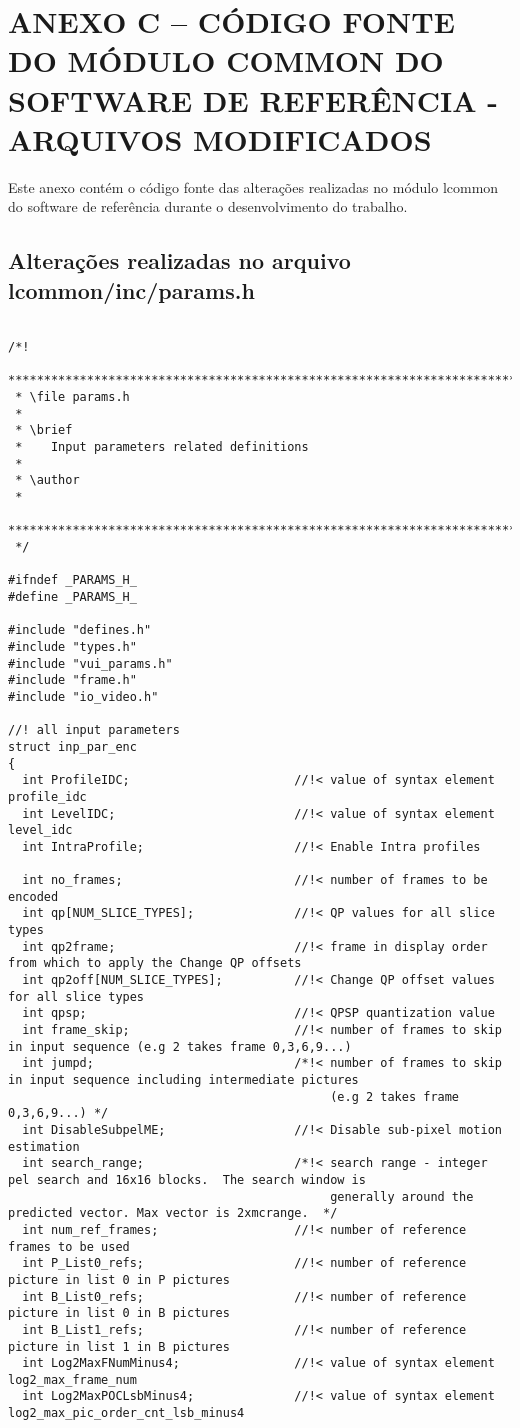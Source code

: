 \chapter{ANEXO C -- CÓDIGO FONTE DO MÓDULO COMMON DO SOFTWARE DE REFERÊNCIA - ARQUIVOS MODIFICADOS}

Este anexo contém o código fonte das alterações realizadas no módulo lcommon do software de referência durante o desenvolvimento do trabalho. 

\section{Alterações realizadas no arquivo lcommon/inc/params.h}

\begin{lstlisting}

/*!
 ************************************************************************
 * \file params.h
 *
 * \brief
 *    Input parameters related definitions
 *
 * \author
 *
 ************************************************************************
 */

#ifndef _PARAMS_H_
#define _PARAMS_H_

#include "defines.h"
#include "types.h"
#include "vui_params.h"
#include "frame.h"
#include "io_video.h"

//! all input parameters
struct inp_par_enc
{
  int ProfileIDC;                       //!< value of syntax element profile_idc
  int LevelIDC;                         //!< value of syntax element level_idc
  int IntraProfile;                     //!< Enable Intra profiles
  
  int no_frames;                        //!< number of frames to be encoded
  int qp[NUM_SLICE_TYPES];              //!< QP values for all slice types
  int qp2frame;                         //!< frame in display order from which to apply the Change QP offsets
  int qp2off[NUM_SLICE_TYPES];          //!< Change QP offset values for all slice types
  int qpsp;                             //!< QPSP quantization value
  int frame_skip;                       //!< number of frames to skip in input sequence (e.g 2 takes frame 0,3,6,9...)
  int jumpd;                            /*!< number of frames to skip in input sequence including intermediate pictures 
                                             (e.g 2 takes frame 0,3,6,9...) */
  int DisableSubpelME;                  //!< Disable sub-pixel motion estimation
  int search_range;                     /*!< search range - integer pel search and 16x16 blocks.  The search window is
                                             generally around the predicted vector. Max vector is 2xmcrange.  */
  int num_ref_frames;                   //!< number of reference frames to be used
  int P_List0_refs;                     //!< number of reference picture in list 0 in P pictures
  int B_List0_refs;                     //!< number of reference picture in list 0 in B pictures
  int B_List1_refs;                     //!< number of reference picture in list 1 in B pictures
  int Log2MaxFNumMinus4;                //!< value of syntax element log2_max_frame_num
  int Log2MaxPOCLsbMinus4;              //!< value of syntax element log2_max_pic_order_cnt_lsb_minus4


\end{lstlisting}

